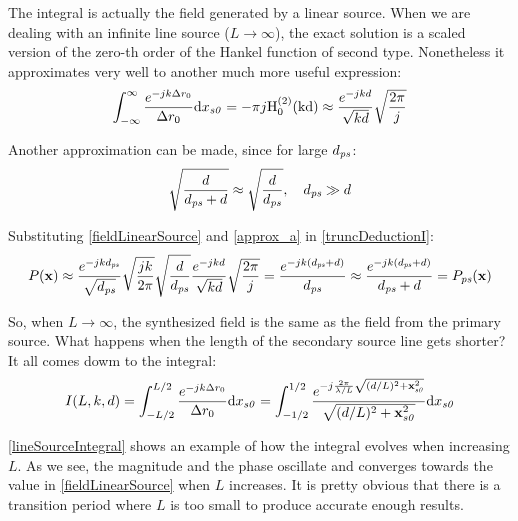 The integral is actually the field generated by a linear source. When we are dealing with an infinite line source ($L \to \infty$), the exact solution is a scaled version of the zero-th order of the Hankel function of second type. Nonetheless it approximates very well to another much more useful expression:
\begin{equation}
\int_{-\infty}^{\infty} \frac{e^{-jk\distLinePoint}}{\distLinePoint} \mathrm{d}x_{\PosTheoSubInd[section]} = -\pi j \mathrm{H_0^{(2)}(k d)} \approx \frac{e^{-jkd}}{\sqrt{kd}}\sqrt{\frac{2\pi}{j}}
\label{fieldLinearSource}
\end{equation}

Another approximation can be made, since for large $d_{\PosTheoSubInd[primarySource]}$:
\begin{equation}
\sqrt{\frac{d}{d_{\PosTheoSubInd[primarySource]} + d}} \approx \sqrt{\frac{d}{d_{\PosTheoSubInd[primarySource]}}}, \quad d_{\PosTheoSubInd[primarySource]} \gg d 
\label{approx_a}
\end{equation}

Substituting \autoref{fieldLinearSource} and \autoref{approx_a} in \autoref{truncDeductionI}:
\begin{equation}
	P(\PosTheo) \approx \frac{e^{-jkd_{\PosTheoSubInd[primarySource]}}}{\sqrt{d_{\PosTheoSubInd[primarySource]}}} \sqrt{\frac{j k}{2\pi}} \sqrt{\frac{d}{d_{\PosTheoSubInd[primarySource]}}} \frac{e^{-jkd}}{\sqrt{kd}}\sqrt{\frac{2\pi}{j}} = \frac{e^{-jk(d_{\PosTheoSubInd[primarySource]} + d)}}{d_{\PosTheoSubInd[primarySource]}} \approx \frac{e^{-jk(d_{\PosTheoSubInd[primarySource]} + d)}}{d_{\PosTheoSubInd[primarySource]} + d} = P_{\PosTheoSubInd[primarySource]}(\PosTheo)
\end{equation}

So, when $L \to \infty$, the synthesized field is the same as the field from the primary source. What happens when the length of the secondary source line gets shorter? It all comes dowm to the integral:
\begin{equation}
I(L, k, d) = \int_{-L/2}^{L/2} \frac{e^{-jk\distLinePoint}}{\distLinePoint} \mathrm{d}x_{\PosTheoSubInd[section]} = \int_{-1/2}^{1/2} \frac{e^{-j\frac{2\pi}{\lambda/L}\sqrt{(d/L)^2 + \PosTheo[section]^2}}}{\sqrt{(d/L)^2 + \PosTheo[section]^2}} \mathrm{d}x_{\PosTheoSubInd[section]}
\label{lineSourceIntegralLfinite}
\end{equation}

\autoref{lineSourceIntegral} shows an example of how the integral evolves when increasing $L$. As we see, the magnitude and the phase oscillate and converges towards the value in \autoref{fieldLinearSource} when $L$ increases. It is pretty obvious that there is a transition period where $L$ is too small to produce accurate enough results.

